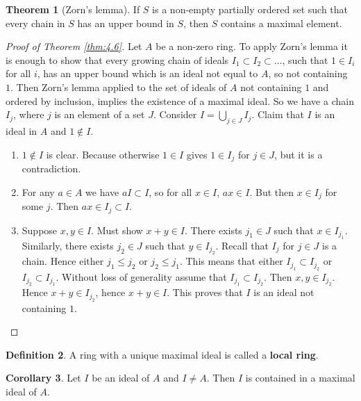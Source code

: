 \documentclass{article}
\theoremstyle{definition}\newtheorem{definition}{Definition}[section]
\theoremstyle{definition}\newtheorem{remark}[definition]{Remark}
\theoremstyle{definition}\newtheorem*{example}{Example}
\theoremstyle{definition}\newtheorem*{note}{Note}
\newtheorem{theorem}[definition]{Theorem}
\newtheorem{corollary}[definition]{Corollary}
\begin{document}
\begin{theorem}[Zorn's lemma]
If $ S $ is a non-empty partially ordered set such that every chain in $ S $ has an upper bound in $ S $, then $ S $ contains a maximal element.
\end{theorem}

\begin{proof}[Proof of Theorem \ref{thm:4.6}]
Let $ A $ be a non-zero ring. To apply Zorn's lemma it is enough to show that every growing chain of ideals $ I_1 \subset I_2 \subset \dots $, such that $ 1 \in I_i $ for all $ i $, has an upper bound which is an ideal not equal to $ A $, so not containing $ 1 $. Then Zorn's lemma applied to the set of ideals of $ A $ not containing $ 1 $ and ordered by inclusion, implies the existence of a maximal ideal. So we have a chain $ I_j $, where $ j $ is an element of a set $ J $. Consider $ I = \bigcup_{j \in J} I_j $. Claim that $ I $ is an ideal in $ A $ and $ 1 \notin I $.
\begin{enumerate}
\item $ 1 \notin I $ is clear. Because otherwise $ 1 \in I $ gives $ 1 \in I_j $ for $ j \in J $, but it is a contradiction.
\item For any $ a \in A $ we have $ aI \subset I $, so for all $ x \in I $, $ ax \in I $. But then $ x \in I_j $ for some $ j $. Then $ ax \in I_j \subset I $.
\item Suppose $ x, y \in I $. Must show $ x + y \in I $. There exists $ j_1 \in J $ such that $ x \in I_{j_1} $. Similarly, there exists $ j_2 \in J $ such that $ y \in I_{j_2} $. Recall that $ I_j $ for $ j \in J $ is a chain. Hence either $ j_1 \le j_2 $ or $ j_2 \le j_1 $. This means that either $ I_{j_1} \subset I_{j_2} $ or $ I_{j_2} \subset I_{j_1} $. Without loss of generality assume that $ I_{j_1} \subset I_{j_2} $. Then $ x, y \in I_{j_2} $. Hence $ x + y \in I_{j_2} $, hence $ x + y \in I $. This proves that $ I $ is an ideal not containing $ 1 $.
\end{enumerate}
\end{proof}

\begin{definition}
A ring with a unique maximal ideal is called a \textbf{local ring}.
\end{definition}

\begin{corollary}
\label{cor:4.9}
Let $ I $ be an ideal of $ A $ and $ I \ne A $. Then $ I $ is contained in a maximal ideal of $ A $.
\end{corollary}
\end{document}
